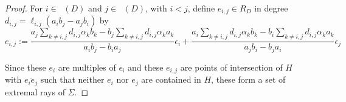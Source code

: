\documentclass{amsart}
\theoremstyle{plain}
\theoremstyle{definition}
\theoremstyle{remark}
\newtheorem{rem}[thm]{Remark}
\numberwithin{equation}{section}
\newcommand\bida{a}
\newcommand\bidb{b}
\DeclareMathOperator{\Tp}{T_+}
\DeclareMathOperator{\Tm}{T_-}
\begin{document}
\begin{proof}
\noindent
For $i \in \Tp(D)$ and $j \in \Tm(D)$, with $i < j$, define $e_{i,j}\in R_D$ in degree $d_{i,j} = \ell_{i, j}(\bida_i \bidb_j - \bida_j \bidb_i)$ by
\begin{equation}\label{eqn:epsilon_i,j}
e_{i,j} := \frac{a_j\sum_{k\ne i,j} d_{i,j}\alpha_k b_k - b_j\sum_{k \ne i,j} d_{i,j} \alpha_k a_k}{a_ib_j - b_i a_j} \epsilon_i + \frac{a_i \sum_{k\ne i,j} d_{i,j} \alpha_k b_k - b_i\sum_{k\ne i,j} d_{i,j} \alpha_ka_k}{a_jb_i - b_j a_i} \epsilon_j
%	
\end{equation}

%

Since these $e_i$ are multiples of $\epsilon_i$ and these
$e_{i,j}$ are points of intersection of $H$ with
$\overline {e_ie_j}$ such that neither $e_i$ nor $e_j$
are contained in $H$, these form a set of extremal rays of $\Sigma$.



\end{proof}
\end{document}
